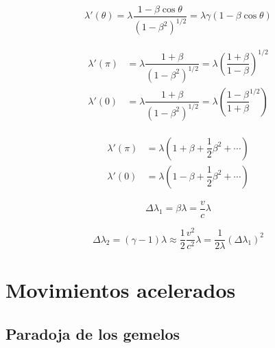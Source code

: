 \documentclass[../main]{subfiles}
\begin{document}
\begin{equation*}
    \lambda'(\theta)=\lambda \dfrac{1-\beta \cos{\theta}}{(1-\beta^2)^{1/2}}=\lambda \gamma(1-\beta \cos{\theta})
\end{equation*}

\begin{gather}
\begin{split}
  \lambda'(\pi)&=\lambda \dfrac{1+\beta}{(1-\beta^2)^{1/2}}=\lambda \left( \dfrac{1+\beta}{1-\beta}\right)^{1/2} \\
  \lambda'(0)&=\lambda \dfrac{1+ \beta}{(1-\beta^2)^{1/2}}=\lambda \left( \dfrac{1-\beta}{1+\beta}^{1/2} \right)
\end{split}
\end{gather}

\begin{align*}
    \lambda'(\pi)&=\lambda \left(1+\beta+\dfrac{1}{2}\beta^2+\cdots \right) \\
    \lambda'(0)&=\lambda \left(1-\beta+\dfrac{1}{2}\beta^2+\cdots \right)
\end{align*}

\begin{equation*}
    \Delta \lambda_1= \beta \lambda=\dfrac{v}{c}\lambda
\end{equation*}

\begin{equation*}
    \Delta \lambda_2=(\gamma-1)\lambda\approx \dfrac{1}{2}\dfrac{v^2}{c^2}\lambda=\dfrac{1}{2\lambda}(\Delta \lambda_1)^2
\end{equation*}

\chapter{Movimientos acelerados}

\section{Paradoja de los gemelos}
\end{document}
